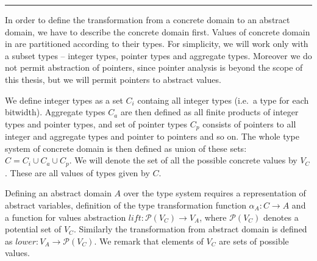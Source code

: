 \hrule

\bigskip

In order to define the transformation from a concrete domain to an abstract
domain, we have to describe the concrete domain first. Values of concrete domain
in \LLVM are partitioned according to their types. For simplicity, we will work
only with a subset \LLVM types -- integer types, pointer types and aggregate
types. Moreover we do not permit abstraction of pointers, since pointer analysis is
beyond the scope of this thesis, but we will permit pointers to abstract values.

We define integer types as a set $C_{i}$ containg all \LLVM integer
types (i.e.~a type for each bitwidth).
Aggregate types $C_a$ are then defined as all finite products of integer types and
pointer types, and set of pointer types $C_p$ consists of pointers to all integer
and aggregate types and pointer to pointers and so on. The whole type system of concrete domain is
then defined as union of these sets: $C = C_i \cup C_a \cup C_p$. We will denote
the set of all the possible concrete values by $V_C$. These are all \LLVM values
of types given by $C$.

Defining an abstract domain $A$ over the \LLVM type system requires a representation of
abstract variables, definition of the type transformation function $\alpha_A \colon C \to A$
and a function for values abstraction $\textit{lift} \colon \mathcal{P}(V_C) \to
V_A$, where $\mathcal{P}(V_C)$ denotes a potential set of $V_C$.
Similarly the transformation from abstract domain is defined as
$\textit{lower} \colon V_A \to \mathcal{P}(V_C)$. We remark that elements of $V_C$
are sets of possible values.

%
%

